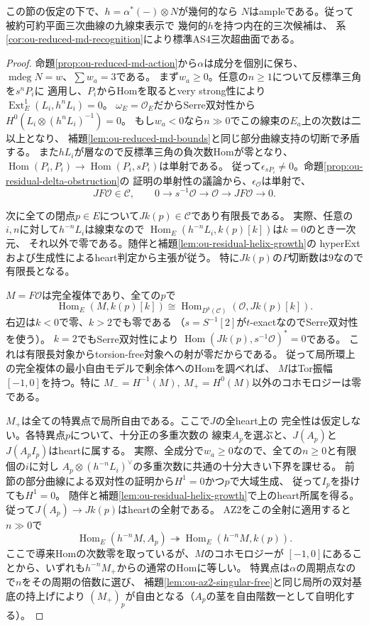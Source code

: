 \begin{theorem}[幾何的反標準移動の豊富性の自動性]
\label{thm:ou-residual-geometric-ample}
この節の仮定の下で、$h=\alpha^*(-)\otimes N$が幾何的なら
$N$はampleである。従って被約可約平面三次曲線の九線束表示で
幾何的$h$を持つ内在的三次候補は、
系\ref{cor:ou-reduced-md-recognition}により標準AS4三次超曲面である。
\end{theorem}
\begin{proof}
命題\ref{prop:ou-reduced-md-action}から$\alpha$は成分を個別に保ち、
$\operatorname{mdeg}N=w$、$\sum w_a=3$である。
まず$w_a\geq0$。任意の$n\ge1$について反標準三角を$s^nP_i$に
適用し、$P_i$からHomを取るとvery strong性により
$\operatorname{Ext}^1_E(L_i,h^n L_i)=0$。
$\omega_E=\mathcal O_E$だからSerre双対性から
$H^0(L_i\otimes(h^n L_i)^{-1})=0$。
もし$w_a<0$なら$n\gg0$でこの線束の$E_a$上の次数は二以上となり、
補題\ref{lem:ou-reduced-md-bounds}と同じ部分曲線支持の切断で矛盾する。
また$h L_i$が層なので反標準三角の負次数Homが零となり、
$\operatorname{Hom}(P_i,P_i)\to\operatorname{Hom}(P_i,sP_i)$は単射である。
従って$\epsilon_{sP_i}\ne0$。命題\ref{prop:ou-residual-delta-obstruction}の
証明の単射性の議論から、$\epsilon_{\mathcal O}$は単射で、
\[
 JF\mathcal O\in\mathcal C,\qquad
 0\to s^{-1}\mathcal O\to\mathcal O\to JF\mathcal O\to0.
\]

次に全ての閉点$p\in E$について$Jk(p)\in\mathcal C$であり有限長である。
実際、任意の$i,n$に対して$h^{-n}L_i$は線束なので
$\operatorname{Hom}_E(h^{-n}L_i,k(p)[k])$は$k=0$のとき一次元、
それ以外で零である。随伴と補題\ref{lem:ou-residual-helix-growth}の
hyperExtおよび生成性によるheart判定から主張が従う。
特に$Jk(p)$の$P$切断数は$9$なので有限長となる。

$M=F\mathcal O$は完全複体であり、全ての$p$で
\[
 \operatorname{Hom}_E(M,k(p)[k])
 \cong \operatorname{Hom}_{D^b(\mathcal C)}(\mathcal O,Jk(p)[k]).
\]
右辺は$k<0$で零、$k>2$でも零である
（$s=S^{-1}[2]$が$t$-exactなのでSerre双対性を使う）。
$k=2$でもSerre双対性により
$\operatorname{Hom}(Jk(p),s^{-1}\mathcal O)^*=0$である。
これは有限長対象からtorsion-free対象への射が零だからである。
従って局所環上の完全複体の最小自由モデルで剰余体へのHomを調べれば、
$M$はTor振幅$[-1,0]$を持つ。特に
$M_-=H^{-1}(M),\ M_+=H^0(M)$以外のコホモロジーは零である。

$M_+$は全ての特異点で局所自由である。ここで$J$の全heart上の
完全性は仮定しない。各特異点$p$について、十分正の多重次数の
線束$A_p$を選ぶと、$J(A_p)$と$J(A_p I_p)$はheartに属する。
実際、全成分で$w_a\geq0$なので、全ての$n\ge0$と有限個の$i$に対し
$A_p\otimes(h^{-n}L_i)^\vee$の多重次数に共通の十分大きい下界を課せる。
前節の部分曲線による双対性の証明から$H^1=0$かつ$p$で大域生成、
従って$I_p$を掛けても$H^1=0$。
随伴と補題\ref{lem:ou-residual-helix-growth}で上のheart所属を得る。
従って$J(A_p)\to Jk(p)$はheartの全射である。
AZ2をこの全射に適用すると$n\gg0$で
\[
 \operatorname{Hom}_E(h^{-n}M,A_p)
 \twoheadrightarrow \operatorname{Hom}_E(h^{-n}M,k(p)).
\]
ここで導来Homの次数零を取っているが、$M$のコホモロジーが
$[-1,0]$にあることから、いずれも$h^{-n}M_+$からの通常のHomに等しい。
特異点は$\alpha$の周期点なので$n$をその周期の倍数に選び、
補題\ref{lem:ou-az2-singular-free}と同じ局所の双対基底の持上げにより
$(M_+)_p$が自由となる（$A_p$の茎を自由階数一として自明化する）。


\end{proof}
